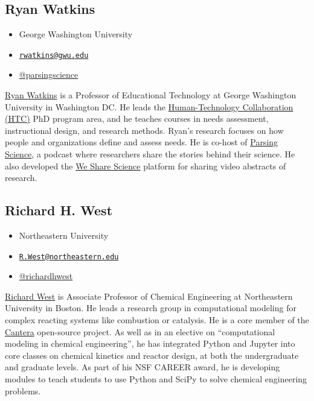 \documentclass[]{book}
\providecommand{\tightlist}{%
  \setlength{\itemsep}{0pt}\setlength{\parskip}{0pt}}
\begin{document}
\subsection*{Ryan Watkins}\label{ryan-watkins}

\begin{itemize}
\tightlist
\item
  George Washington University
\item
  \href{mailto:rwatkins@gwu.edu}{\nolinkurl{rwatkins@gwu.edu}}
\item
  \href{https://twitter.com/parsingscience}{@parsingscience}
\end{itemize}

\href{https://gsehd.gwu.edu/directory/ryan-watkins}{Ryan Watkins} is a
Professor of Educational Technology at George Washington University in
Washington DC. He leads the
\href{https://go.gwu.edu/phd}{Human-Technology Collaboration (HTC)} PhD
program area, and he teaches courses in needs assessment, instructional
design, and research methods. Ryan's research focuses on how people and
organizations define and assess needs. He is co-host of
\href{https://parsingscience.org/}{Parsing Science}, a podcast where
researchers share the stories behind their science. He also developed
the \href{https://wesharescience.org/}{We Share Science} platform for
sharing video abstracts of research.

\subsection*{Richard H. West}\label{richard-h.-west}

\begin{itemize}
\tightlist
\item
  Northeastern University
\item
  \href{mailto:R.West@northeastern.edu}{\nolinkurl{R.West@northeastern.edu}}
\item
  \href{https://twitter.com/richardhwest}{@richardhwest}
\end{itemize}

\href{https://web.northeastern.edu/comocheng/}{Richard West} is
Associate Professor of Chemical Engineering at Northeastern University
in Boston. He leads a research group in computational modeling for
complex reacting systems like combustion or catalysis. He is a core
member of the \href{https://cantera.org/}{Cantera} open-source project.
As well as in an elective on ``computational modeling in chemical
engineering'', he has integrated Python and Jupyter into core classes on
chemical kinetics and reactor design, at both the undergraduate and
graduate levels. As part of his NSF CAREER award, he is developing
modules to teach students to use Python and SciPy to solve chemical
engineering problems.
\end{document}
